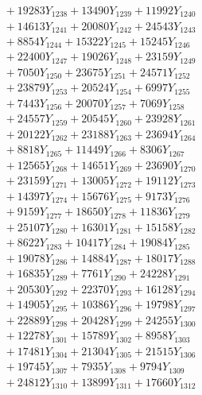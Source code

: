 \documentclass[a4paper,10pt]{article}
\begin{document}
{\begin{align}
&\;  + 19283 Y_{1238} + 13490 Y_{1239} + 11992 Y_{1240} \\[0.3ex]
&\;  + 14613 Y_{1241} + 20080 Y_{1242} + 24543 Y_{1243} \\[0.3ex]
&\;  + 8854 Y_{1244} + 15322 Y_{1245} + 15245 Y_{1246} \\[0.3ex]
&\;  + 22400 Y_{1247} + 19026 Y_{1248} + 23159 Y_{1249} \\[0.3ex]
&\;  + 7050 Y_{1250} + 23675 Y_{1251} + 24571 Y_{1252} \\[0.3ex]
&\;  + 23879 Y_{1253} + 20524 Y_{1254} + 6997 Y_{1255} \\[0.3ex]
&\;  + 7443 Y_{1256} + 20070 Y_{1257} + 7069 Y_{1258} \\[0.5ex]\allowbreak
&\;  + 24557 Y_{1259} + 20545 Y_{1260} + 23928 Y_{1261} \\[0.3ex]
&\;  + 20122 Y_{1262} + 23188 Y_{1263} + 23694 Y_{1264} \\[0.3ex]
&\;  + 8818 Y_{1265} + 11449 Y_{1266} + 8306 Y_{1267} \\[0.3ex]
&\;  + 12565 Y_{1268} + 14651 Y_{1269} + 23690 Y_{1270} \\[0.3ex]
&\;  + 23159 Y_{1271} + 13005 Y_{1272} + 19112 Y_{1273} \\[0.3ex]
&\;  + 14397 Y_{1274} + 15676 Y_{1275} + 9173 Y_{1276} \\[0.3ex]
&\;  + 9159 Y_{1277} + 18650 Y_{1278} + 11836 Y_{1279} \\[0.3ex]
&\;  + 25107 Y_{1280} + 16301 Y_{1281} + 15158 Y_{1282} \\[0.3ex]
&\;  + 8622 Y_{1283} + 10417 Y_{1284} + 19084 Y_{1285} \\[0.3ex]
&\;  + 19078 Y_{1286} + 14884 Y_{1287} + 18017 Y_{1288} \\[0.5ex]\allowbreak
&\;  + 16835 Y_{1289} + 7761 Y_{1290} + 24228 Y_{1291} \\[0.3ex]
&\;  + 20530 Y_{1292} + 22370 Y_{1293} + 16128 Y_{1294} \\[0.3ex]
&\;  + 14905 Y_{1295} + 10386 Y_{1296} + 19798 Y_{1297} \\[0.3ex]
&\;  + 22889 Y_{1298} + 20428 Y_{1299} + 24255 Y_{1300} \\[0.3ex]
&\;  + 12278 Y_{1301} + 15789 Y_{1302} + 8958 Y_{1303} \\[0.3ex]
&\;  + 17481 Y_{1304} + 21304 Y_{1305} + 21515 Y_{1306} \\[0.3ex]
&\;  + 19745 Y_{1307} + 7935 Y_{1308} + 9794 Y_{1309} \\[0.3ex]
&\;  + 24812 Y_{1310} + 13899 Y_{1311} + 17660 Y_{1312} \\[0.3ex]

\end{align}}
\end{document}
